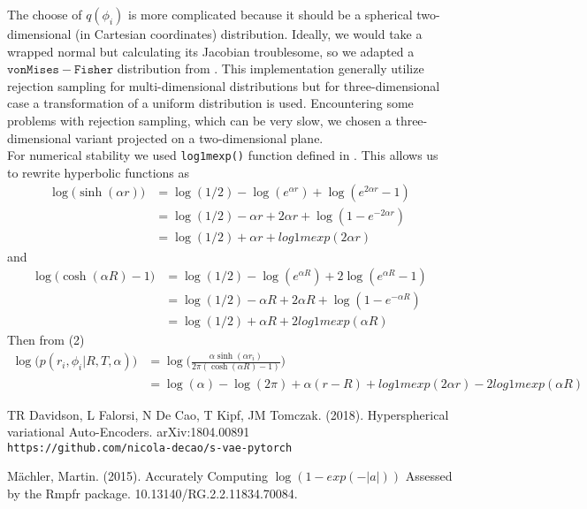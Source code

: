 \documentclass{article}
\begin{document}
The choose of $q(\phi_i)$ is more complicated because it should be a spherical two-dimensional (in Cartesian coordinates) distribution. Ideally, we would take a wrapped normal but calculating its Jacobian troublesome, so we adapted a $\mathtt{von Mises-Fisher}$ distribution from \cite{vmf}. This implementation generally utilize rejection sampling for multi-dimensional distributions but for three-dimensional case a transformation of a uniform distribution is used. Encountering some problems with rejection sampling, which can be very slow, we chosen a three-dimensional variant projected on a two-dimensional plane.\\

For numerical stability we used \verb|log1mexp()| function defined in \cite{log1mexp}. This allows us to rewrite hyperbolic functions as
\begin{equation}
\begin{split}
\log \big(\sinh(\alpha r)\big) &= \log(1/2) - \log(e^{\alpha r}) + \log(e^{2 \alpha r}-1)\\
&= \log(1/2) - \alpha r + 2 \alpha r + \log(1 - e^{-2 \alpha r})\\
&= \log(1/2) + \alpha r + log1mexp (2 \alpha r)
\end{split}
\end{equation} 
and
\begin{equation}
\begin{split}
\log \big(\cosh(\alpha R) -1\big) &= \log(1/2) - \log(e^{\alpha R}) + 2 \log(e^{\alpha R}-1)\\
&= \log(1/2) - \alpha R + 2 \alpha R + \log(1 - e^{-\alpha R})\\
&= \log(1/2) + \alpha R + 2 log1mexp (\alpha R)
\end{split}
\end{equation} 
Then from (2) 
\begin{equation}
\begin{split}
\log \big( p(r_i, \phi_i | R,T,\alpha) \big) &= \log \Biggl( \frac{\alpha \sinh (\alpha r_i)}{2 \pi (\cosh (\alpha R) -1)} \Biggr)\\
&= \log( \alpha ) - \log(2\pi) + \alpha (r-R) + log1mexp (2 \alpha r) - 2 log1mexp (\alpha R)
\end{split}
\end{equation}

\begin{thebibliography}{}
	TR Davidson, L Falorsi, N De Cao, T Kipf, JM Tomczak. (2018). Hyperspherical variational Auto-Encoders. arXiv:1804.00891 \\
	\texttt{https://github.com/nicola-decao/s-vae-pytorch}
	
	M\"achler, Martin. (2015). Accurately Computing $\log(1 - exp(-|a|))$ Assessed by the Rmpfr package. 10.13140/RG.2.2.11834.70084. 	
	
	
\end{thebibliography}
\end{document}
